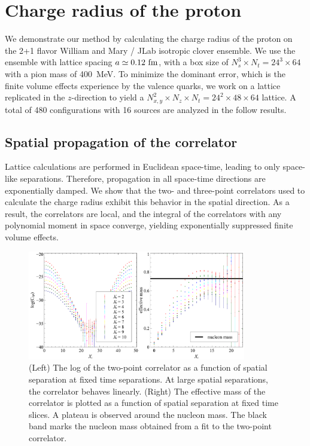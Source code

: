 \documentclass{PoS}
\begin{document}
\section{Charge radius of the proton}
We demonstrate our method by calculating the charge radius of the
proton on the 2+1 flavor William and Mary / JLab isotropic clover
ensemble.  We use the ensemble with lattice spacing $a \simeq
0.12~{\rm fm}$, with a box size of $N_s^3\times N_t = 24^3\times 64$
with a pion mass of 400~MeV. To minimize the dominant error, which is
the finite volume effects experience by the valence quarks, we work on
a lattice replicated in the $z$-direction to yield a $N_{x,y}^2 \times
N_z \times N_t = 24^2\times 48\times 64$ lattice.  A total of 480
configurations with 16 sources are analyzed in the follow results.

\subsection{Spatial propagation of the correlator}
Lattice calculations are performed in Euclidean space-time, leading to
only space-like separations.  Therefore, propagation in all space-time
directions are exponentially damped. We show that the two- and
three-point correlators used to calculate the charge radius exhibit
this behavior in the spatial direction. As a result, the correlators
are local, and the integral of the correlators with any polynomial
moment in space converge, yielding exponentially suppressed finite
volume effects.

\begin{figure}[h]
	\centering
		\includegraphics[width=0.85\textwidth]{./2ptzcorr.pdf}
	\caption{(Left) The log of the two-point correlator as a function of spatial separation at fixed time separations. At large spatial separations, the correlator behaves linearly.  (Right) The effective mass of the correlator is plotted as a function of spatial separation at fixed time slices.  A plateau is observed around the nucleon mass. The black band marks the nucleon mass obtained from a fit to the two-point correlator.}
	\label{fig:2pt_zcorr}
\end{figure}
\end{document}
